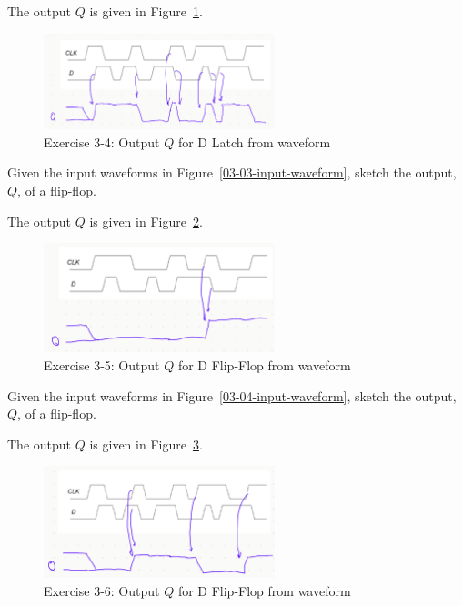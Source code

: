 \documentclass[12pt]{article}
\newenvironment{ex}[2][Exercise]{\begin{trivlist}
		\item[\hskip \labelsep {\bfseries #1}\hskip \labelsep {\bfseries #2.}]}{\end{trivlist}}
\newenvironment{sol}[1][Solution]{\begin{trivlist}
		\item[\hskip \labelsep {\bfseries #1:}]}{\end{trivlist}}
\begin{document}
\begin{sol}
	The output $Q$ is given in Figure~\ref{03-04-D-latch-output}.
	\begin{figure}[h]
		\centering
		\includegraphics[width=0.6\textwidth]{03-04-D-latch-output}
		\caption{Exercise 3-4: Output $Q$ for D Latch from waveform}
		\label{03-04-D-latch-output}
	\end{figure}
\end{sol}

\begin{ex}{3.5}
	Given the input waveforms in Figure~\ref{03-03-input-waveform}, sketch the output, $Q$, of a flip-flop.
\end{ex}

\begin{sol}
	The output $Q$ is given in Figure~\ref{03-05-D-flip-flop-output}.
	\begin{figure}[h]
		\centering
		\includegraphics[width=0.6\textwidth]{03-05-D-flip-flop-output}
		\caption{Exercise 3-5: Output $Q$ for D Flip-Flop from waveform}
		\label{03-05-D-flip-flop-output}
	\end{figure}
\end{sol}

\begin{ex}{3.6}
	Given the input waveforms in Figure~\ref{03-04-input-waveform}, sketch the output, $Q$, of a flip-flop.
\end{ex}

\begin{sol}
	The output $Q$ is given in Figure~\ref{03-06-D-flip-flop-output}.
	\begin{figure}[h]
		\centering
		\includegraphics[width=0.6\textwidth]{03-06-D-flip-flop-output}
		\caption{Exercise 3-6: Output $Q$ for D Flip-Flop from waveform}
		\label{03-06-D-flip-flop-output}
	\end{figure}
\end{sol}
\end{document}
